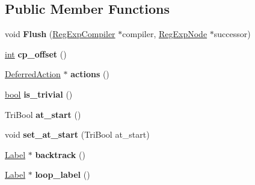 \subsection*{Public Member Functions}
\begin{DoxyCompactItemize}
\item 
\mbox{\label{classv8_1_1internal_1_1Trace_a1bd6080f97b33251cd6e8c3ad8f5ead3}} 
void {\bfseries Flush} (\mbox{\hyperlink{classv8_1_1internal_1_1RegExpCompiler}{Reg\+Exp\+Compiler}} $\ast$compiler, \mbox{\hyperlink{classv8_1_1internal_1_1RegExpNode}{Reg\+Exp\+Node}} $\ast$successor)
\item 
\mbox{\label{classv8_1_1internal_1_1Trace_a9cb9dd697dda62f3db7e9ec3ecd823df}} 
\mbox{\hyperlink{classint}{int}} {\bfseries cp\+\_\+offset} ()
\item 
\mbox{\label{classv8_1_1internal_1_1Trace_a7c53de86842d2c338b9302386d5cbacd}} 
\mbox{\hyperlink{classv8_1_1internal_1_1Trace_1_1DeferredAction}{Deferred\+Action}} $\ast$ {\bfseries actions} ()
\item 
\mbox{\label{classv8_1_1internal_1_1Trace_a6f3ce5f13fa43ca8e437a872deca5d40}} 
\mbox{\hyperlink{classbool}{bool}} {\bfseries is\+\_\+trivial} ()
\item 
\mbox{\label{classv8_1_1internal_1_1Trace_a5f204f16aa287881fd2f0f310094a647}} 
Tri\+Bool {\bfseries at\+\_\+start} ()
\item 
\mbox{\label{classv8_1_1internal_1_1Trace_a35e88e274974fe1df70db67b9e3a2dc7}} 
void {\bfseries set\+\_\+at\+\_\+start} (Tri\+Bool at\+\_\+start)
\item 
\mbox{\label{classv8_1_1internal_1_1Trace_ab4b78fba6c18060801cff3302ad759f2}} 
\mbox{\hyperlink{classv8_1_1internal_1_1Label}{Label}} $\ast$ {\bfseries backtrack} ()
\item 
\mbox{\label{classv8_1_1internal_1_1Trace_a63ab79cbd87d9713d91e895eb564d986}} 
\mbox{\hyperlink{classv8_1_1internal_1_1Label}{Label}} $\ast$ {\bfseries loop\+\_\+label} ()

\end{DoxyCompactItemize}
